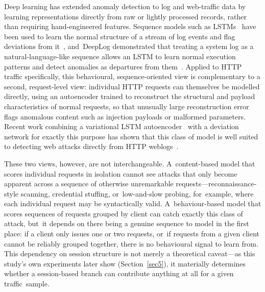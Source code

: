 \documentclass[futureinternet,article,accept,moreauthors]{Definitions/mdpi}
\begin{document}
Deep learning has extended anomaly detection to log and web-traffic data by learning representations directly from raw or lightly processed records, rather than requiring hand-engineered features. Sequence models such as LSTMs~\cite{hochreiter1997} have been used to learn the normal structure of a stream of log events and flag deviations from it~\cite{nedelkoski2020}, and~DeepLog demonstrated that treating a system log as a natural-language-like sequence allows an LSTM to learn normal execution patterns and detect anomalies as departures from them~\cite{du2017}. Applied to HTTP traffic specifically, this behavioural, sequence-oriented view is complementary to a second, request-level view: individual HTTP requests can themselves be modelled directly, using an autoencoder trained to reconstruct the structural and payload characteristics of normal requests, so that unusually large reconstruction error flags anomalous content such as injection payloads or malformed parameters. Recent work combining a variational LSTM autoencoder~\cite{kingma2014,ancho2015} with a deviation network for exactly this purpose has shown that this class of model is well suited to detecting web attacks directly from HTTP weblogs~\cite{jagat2024}.

These two views, however, are not interchangeable. A~content-based model that scores individual requests in isolation cannot see attacks that only become apparent across a sequence of otherwise unremarkable requests---reconnaissance-style scanning, credential stuffing, or~low-and-slow probing, for~example, where each individual request may be syntactically valid. A~behaviour-based model that scores sequences of requests grouped by client can catch exactly this class of attack, but~it depends on there being a genuine sequence to model in the first place: if a client only issues one or two requests, or~if requests from a given client cannot be reliably grouped together, there is no behavioural signal to learn from. This dependency on session structure is not merely a theoretical caveat---as this study's own experiments later show (Section~\ref{sec5}), it materially determines whether a session-based branch can contribute anything at all for a given traffic~sample.
\end{document}
